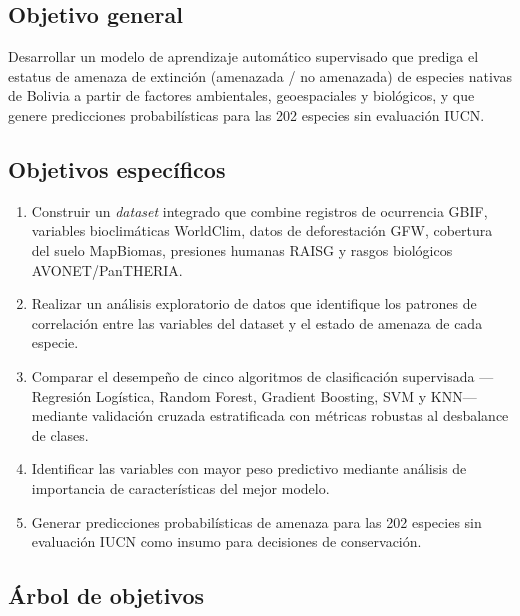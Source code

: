 \documentclass[12pt,a4paper]{article}
\begin{document}
\subsection{Objetivo general}

Desarrollar un modelo de aprendizaje automático supervisado que prediga el estatus de amenaza
de extinción (amenazada / no amenazada) de especies nativas de Bolivia a partir de factores
ambientales, geoespaciales y biológicos, y que genere predicciones probabilísticas para las
202 especies sin evaluación IUCN.

\subsection{Objetivos específicos}

\begin{enumerate}[label=\textbf{OE\arabic*.}]
  \item Construir un \textit{dataset} integrado que combine registros de ocurrencia GBIF,
        variables bioclimáticas WorldClim, datos de deforestación GFW, cobertura del suelo
        MapBiomas, presiones humanas RAISG y rasgos biológicos AVONET/PanTHERIA.
  \item Realizar un análisis exploratorio de datos que identifique los patrones de correlación
        entre las variables del dataset y el estado de amenaza de cada especie.
  \item Comparar el desempeño de cinco algoritmos de clasificación supervisada ---Regresión Logística,
        Random Forest, Gradient Boosting, SVM y KNN--- mediante validación cruzada estratificada
        con métricas robustas al desbalance de clases.
  \item Identificar las variables con mayor peso predictivo mediante análisis de importancia de
        características del mejor modelo.
  \item Generar predicciones probabilísticas de amenaza para las 202 especies sin evaluación IUCN
        como insumo para decisiones de conservación.
\end{enumerate}

\subsection{Árbol de objetivos}
\end{document}
